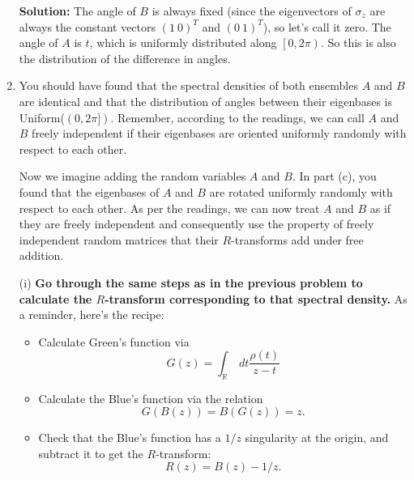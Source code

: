 \documentclass[a4paper]{article}
\begin{document}
\begin{enumerate}[label=(\alph*)]
\begin{tcolorbox}
\textbf{Solution:}
The angle of $B$ is always fixed (since the eigenvectors of $\sigma_z$ are always the constant vectors $(1 ~ 0)^T$ and $(0 ~  1)^T$), so let's call it zero.  The angle of $A$ is $t$, which is uniformly distributed along  $\left[0, 2\pi\right)$.  So this is also the distribution of the difference in angles. 
\end{tcolorbox}

\item You should have found that the spectral densities of both ensembles $A$ and $B$ are identical and that the distribution of angles between their eigenbases is Uniform($(0,2\pi])$. Remember, according to the readings, we can call $A$ and $B$ freely independent if their eigenbases are oriented uniformly randomly with respect to each other.

Now we imagine adding the random variables $A$ and $B$.  In part (c), you found that the eigenbases of $A$ and $B$ are rotated uniformly randomly with respect to each other. As per the readings, we can now treat $A$ and $B$ as if they are freely independent and consequently use the property of freely independent random matrices that their $R$-transforms add under free addition.  

(i) \textbf{Go through the same steps as in the previous problem to calculate the $R$-transform corresponding to that spectral density.} As a reminder, here's the recipe:
    \begin{itemize}
        \item Calculate Green's function via 
        \begin{equation}
         G(z) = \int_\mathbb{R}~dt \frac{\rho(t)}{z - t}
        \end{equation}
        
        \item Calculate the Blue's function via the relation
        \begin{equation}
            G(B(z)) = B(G(z)) = z.
        \end{equation}
        
        \item Check that the Blue's function has a $1/z$ singularity at the origin, and subtract it to get the $R$-transform:
        \begin{equation}
            R(z) = B(z) - 1/z.
        \end{equation}
    \end{itemize}
    

\end{enumerate}
\end{document}
